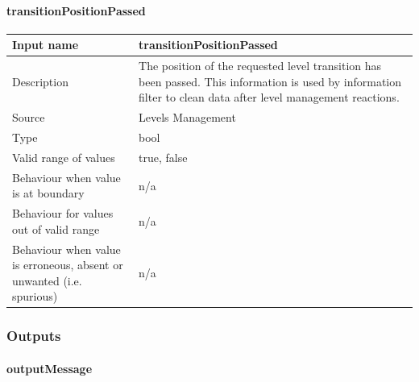 \paragraph{transitionPositionPassed}

\begin{longtable}{p{}p{}}
\toprule
Input name				& transitionPositionPassed \\
\midrule
Description				& The position of the requested level transition has been passed.
This information is used by information filter to clean data after level management reactions.

\\
\midrule
Source					& Levels Management\\ 
\midrule
Type					&bool\\
\midrule
Valid range of values	& true, false\\
\midrule
Behaviour when value is at boundary	& n/a\\
\midrule
Behaviour for values out of valid range	& n/a\\
\midrule
Behaviour when value is erroneous, absent or unwanted (i.e. spurious) & n/a\\
\bottomrule
\end{longtable}
\subsubsection{Outputs}\label{s:Manage_Trackside_outputs}

\paragraph{outputMessage}

